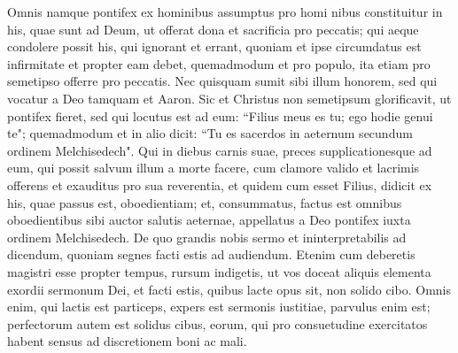 \begin{biblechapter} 
\verse Omnis namque pontifex ex hominibus assumptus pro homi nibus constituitur in his, quae sunt ad Deum, ut offerat dona et sacrificia pro peccatis; 
\verse qui aeque condolere possit his, qui ignorant et errant, quoniam et ipse circumdatus est infirmitate 
\verse et propter eam debet, quemadmodum et pro populo, ita etiam pro semetipso offerre pro peccatis. 
\verse Nec quisquam sumit sibi illum honorem, sed qui vocatur a Deo tamquam et Aaron. 
\verse Sic et Christus non semetipsum glorificavit, ut pontifex fieret, sed qui locutus est ad eum: “Filius meus es tu; ego hodie genui te"; 
\verse quemadmodum et in alio dicit: “Tu es sacerdos in aeternum secundum ordinem Melchisedech". 
\verse Qui in diebus carnis suae, preces supplicationesque ad eum, qui possit salvum illum a morte facere, cum clamore valido et lacrimis offerens et exauditus pro sua reverentia, 
\verse et quidem cum esset Filius, didicit ex his, quae passus est, oboedientiam; 
\verse et, consummatus, factus est omnibus oboedientibus sibi auctor salutis aeternae, 
\verse appellatus a Deo pontifex iuxta ordinem Melchisedech. 
\verse De quo grandis nobis sermo et ininterpretabilis ad dicendum, quoniam segnes facti estis ad audiendum. 
\verse Etenim cum deberetis magistri esse propter tempus, rursum indigetis, ut vos doceat aliquis elementa exordii sermonum Dei, et facti estis, quibus lacte opus sit, non solido cibo. 
\verse Omnis enim, qui lactis est particeps, expers est sermonis iustitiae, parvulus enim est; 
\verse perfectorum autem est solidus cibus, eorum, qui pro consuetudine exercitatos habent sensus ad discretionem boni ac mali. 
\end{biblechapter}

